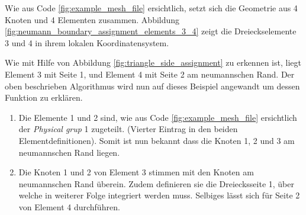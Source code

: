 Wie aus Code \ref{fig:example_mesh_file} ersichtlich, setzt sich die Geometrie aus 4 Knoten und 4 Elementen zusammen. Abbildung \ref{fig:neumann_boundary_assignment_elements_3_4} zeigt die Dreieckselemente 3 und 4 in ihrem lokalen Koordinatensystem. 

Wie mit Hilfe von Abbildung \ref{fig:triangle_side_assignment} zu erkennen ist, liegt Element 3 mit Seite 1, und Element 4 mit Seite 2 am neumannschen Rand. Der oben beschrieben Algorithmus wird nun auf dieses Beispiel angewandt um dessen Funktion zu erklären.\newline
\begin{enumerate}
	\item Die Elemente 1 und 2 sind, wie aus Code \ref{fig:example_mesh_file} ersichtlich der \textit{Physical grup} 1 zugeteilt. (Vierter Eintrag in den beiden Elementdefinitionen). Somit ist nun bekannt dass die Knoten 1, 2 und 3 am neumannschen Rand liegen.
	\item Die Knoten 1 und 2 von Element 3 stimmen mit den Knoten am neumannschen Rand überein. Zudem definieren sie die Dreiecksseite 1, über welche in weiterer Folge integriert werden muss. Selbiges lässt sich für Seite 2 von Element 4 durchführen.
\end{enumerate}
